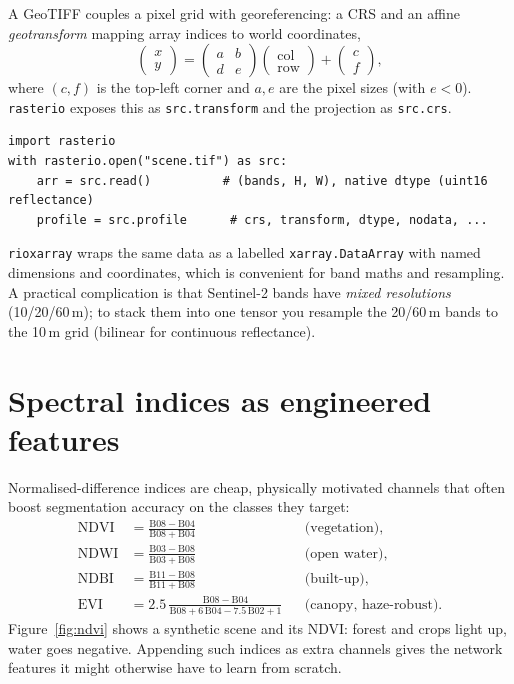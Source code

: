 A GeoTIFF couples a pixel grid with georeferencing: a CRS and an affine
\emph{geotransform} mapping array indices to world coordinates,
\begin{equation}
\begin{pmatrix}x\\y\end{pmatrix}
=\begin{pmatrix}a & b\\ d & e\end{pmatrix}\!\begin{pmatrix}\mathrm{col}\\ \mathrm{row}\end{pmatrix}
+\begin{pmatrix}c\\ f\end{pmatrix},
\end{equation}
where $(c,f)$ is the top-left corner and $a,e$ are the pixel sizes (with
$e<0$). \texttt{rasterio} exposes this as \texttt{src.transform} and the
projection as \texttt{src.crs}.
\begin{lstlisting}
import rasterio
with rasterio.open("scene.tif") as src:
    arr = src.read()          # (bands, H, W), native dtype (uint16 reflectance)
    profile = src.profile      # crs, transform, dtype, nodata, ...
\end{lstlisting}
\texttt{rioxarray} wraps the same data as a labelled \texttt{xarray.DataArray}
with named dimensions and coordinates, which is convenient for band maths and
resampling. A practical complication is that Sentinel-2 bands have \emph{mixed
resolutions} (10/20/60\,m); to stack them into one tensor you resample the
20/60\,m bands to the 10\,m grid (bilinear for continuous reflectance).

\section{Spectral indices as engineered features}

Normalised-difference indices are cheap, physically motivated channels that
often boost segmentation accuracy on the classes they target:
\begin{align}
\mathrm{NDVI} &= \frac{\mathrm{B08}-\mathrm{B04}}{\mathrm{B08}+\mathrm{B04}} &&\text{(vegetation)},\\
\mathrm{NDWI} &= \frac{\mathrm{B03}-\mathrm{B08}}{\mathrm{B03}+\mathrm{B08}} &&\text{(open water)},\\
\mathrm{NDBI} &= \frac{\mathrm{B11}-\mathrm{B08}}{\mathrm{B11}+\mathrm{B08}} &&\text{(built-up)},\\
\mathrm{EVI} &= 2.5\,\frac{\mathrm{B08}-\mathrm{B04}}{\mathrm{B08}+6\,\mathrm{B04}-7.5\,\mathrm{B02}+1} &&\text{(canopy, haze-robust)}.
\end{align}
Figure~\ref{fig:ndvi} shows a synthetic scene and its NDVI: forest and crops
light up, water goes negative. Appending such indices as extra channels gives
the network features it might otherwise have to learn from scratch.

